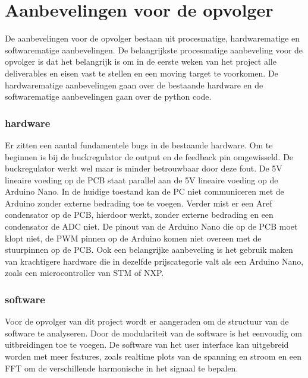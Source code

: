 \section{Aanbevelingen voor de opvolger}
De aanbevelingen voor de opvolger bestaan uit procesmatige, hardwarematige en softwarematige aanbevelingen. De belangrijkste procesmatige aanbeveling voor de opvolger is dat het belangrijk is om in de eerste weken van het project alle deliverables en eisen vast te stellen en een moving target te voorkomen. De hardwarematige aanbevelingen gaan over de bestaande hardware en de softwarematige aanbevelingen gaan over de python code.
\subsubsection{hardware}
Er zitten een aantal fundamentele bugs in de bestaande hardware. Om te beginnen is bij de buckregulator de output en de feedback pin omgewisseld. De buckregulator werkt wel maar is minder betrouwbaar door deze fout. De 5V lineaire voeding op de PCB staat parallel aan de 5V lineaire voeding op de Arduino Nano. In de huidige toestand kan de PC niet communiceren met de Arduino zonder externe bedrading toe te voegen. Verder mist er een Aref condensator op de PCB, hierdoor werkt, zonder externe bedrading en een condensator de ADC niet. De pinout van de Arduino Nano die op de PCB moet klopt niet, de PWM pinnen op de Arduino komen niet overeen met de stuurpinnen op de PCB. Ook een belangrijke aanbeveling is het gebruik maken van krachtigere hardware die in dezelfde prijscategorie valt als een Arduino Nano, zoals een microcontroller van STM of NXP.
\subsubsection{software}
Voor de opvolger van dit project wordt er aangeraden om de structuur van de software te analyseren. Door de modulariteit van de software is het eenvoudig om uitbreidingen toe te voegen. De software van het user interface kan uitgebreid worden met meer features, zoals realtime plots van de spanning en stroom en een FFT om de verschillende harmonische in het signaal te bepalen.
